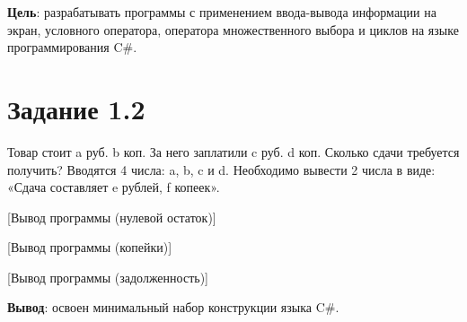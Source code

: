 \documentclass{bsuir}
\newcommand{\csharp}{C{\liberationrm\#}}
\begin{document}

\textbf{Цель}: разрабатывать программы с применением ввода-вывода информации на
экран, условного оператора, оператора множественного выбора и циклов на языке
программирования \csharp.

\section*{Задание 1.2}

Товар стоит a руб. b коп. За него заплатили c руб. d коп. Сколько сдачи
требуется получить? Вводятся 4 числа: a, b, c и d. Необходимо вывести 2 числа в
виде: «Сдача составляет e рублей, f копеек».


[Вывод программы (нулевой остаток)]

[Вывод программы (копейки)]

[Вывод программы (задолженность)]

\textbf{Вывод}: освоен минимальный набор конструкции языка \csharp.
\end{document}
